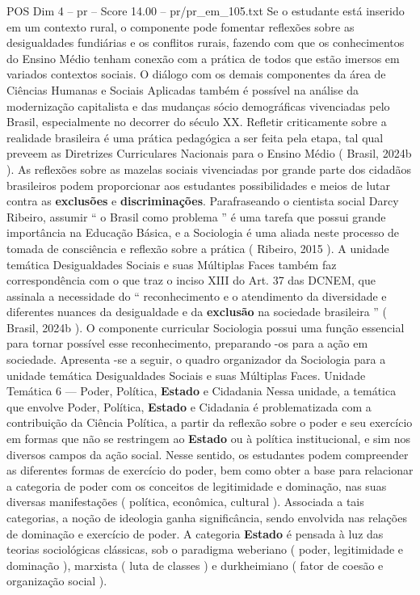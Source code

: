 \begin{textsample}{POS Dim 4 – pr – Score 14.00 – pr/pr\_em\_105.txt}
Se o estudante está inserido em um contexto rural, o componente pode fomentar reflexões sobre as desigualdades fundiárias e os conflitos rurais, fazendo com que os conhecimentos do Ensino Médio tenham conexão com a prática de todos que estão imersos em variados contextos sociais.
O diálogo com os demais componentes da área de Ciências Humanas e Sociais Aplicadas também é possível na análise da modernização capitalista e das mudanças sócio demográficas vivenciadas pelo Brasil, especialmente no decorrer do século XX.
Refletir criticamente sobre a realidade brasileira é uma prática pedagógica a ser feita pela etapa, tal qual preveem as Diretrizes Curriculares Nacionais para o Ensino Médio ( Brasil, 2024b ).
As reflexões sobre as mazelas sociais vivenciadas por grande parte dos cidadãos brasileiros podem proporcionar aos estudantes possibilidades e meios de lutar contra as \textbf{exclusões} e \textbf{discriminações}.
Parafraseando o cientista social Darcy Ribeiro, assumir “ o Brasil como problema ” é uma tarefa que possui grande importância na Educação Básica, e a Sociologia é uma aliada neste processo de tomada de consciência e reflexão sobre a prática ( Ribeiro, 2015 ).
A unidade temática Desigualdades Sociais e suas Múltiplas Faces também faz correspondência com o que traz o inciso XIII do Art. 37 das DCNEM, que assinala a necessidade do “ reconhecimento e o atendimento da diversidade e diferentes nuances da desigualdade e da \textbf{exclusão} na sociedade brasileira ” ( Brasil, 2024b ).
O componente curricular Sociologia possui uma função essencial para tornar possível esse reconhecimento, preparando -os para a ação em sociedade.
Apresenta -se a seguir, o quadro organizador da Sociologia para a unidade temática Desigualdades Sociais e suas Múltiplas Faces.
Unidade Temática 6 — Poder, Política, \textbf{Estado} e Cidadania Nessa unidade, a temática que envolve Poder, Política, \textbf{Estado} e Cidadania é problematizada com a contribuição da Ciência Política, a partir da reflexão sobre o poder e seu exercício em formas que não se restringem ao \textbf{Estado} ou à política institucional, e sim nos diversos campos da ação social.
Nesse sentido, os estudantes podem compreender as diferentes formas de exercício do poder, bem como obter a base para relacionar a categoria de poder com os conceitos de legitimidade e dominação, nas suas diversas manifestações ( política, econômica, cultural ).
Associada a tais categorias, a noção de ideologia ganha significância, sendo envolvida nas relações de dominação e exercício de poder.
A categoria \textbf{Estado} é pensada à luz das teorias sociológicas clássicas, sob o paradigma weberiano ( poder, legitimidade e dominação ), marxista ( luta de classes ) e durkheimiano ( fator de coesão e organização social ).

\end{textsample}
